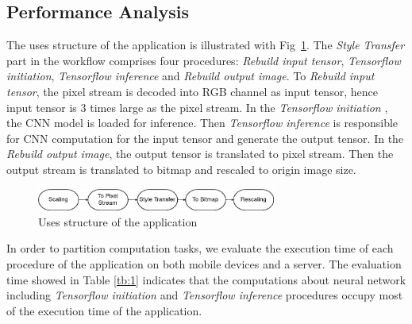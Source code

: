 \documentclass[a4paper,11pt,onecolumn,twoside]{article}
\begin{document}
\begin{CJK*}{GBK}{song}
\subsection{Performance Analysis}


The uses structure of the application is illustrated with Fig~\ref{fig:uses}.
The \emph{Style Transfer} part in the workflow comprises four procedures: 
\textit{Rebuild input tensor}, \textit{Tensorflow initiation}, 
\textit{Tensorflow inference} and \textit{Rebuild output image}.
To \textit{Rebuild input tensor}, the pixel stream is decoded
into RGB channel as input tensor, hence input tensor is 3 times
large as the pixel stream. In the \textit{Tensorflow initiation}
, the CNN model is loaded for inference. 
Then \textit{Tensorflow inference} is responsible for CNN 
computation for the input tensor and generate the output tensor.
In the \textit{Rebuild output image}, 
the output tensor is translated to pixel stream.
Then the output stream is translated to bitmap and rescaled to origin
image size.


\begin{figure}[!htb] %
  \centering %
  \includegraphics[width=0.7\textwidth]{uses} %
  \caption{Uses structure of the application} %
  \label{fig:uses} %
\end{figure}

In order to partition computation tasks,
we evaluate the execution time of each procedure of the application
on both mobile devices and a server. 
The evaluation time showed in Table \ref{tb:1} indicates that the 
computations about neural network including 
\textit{Tensorflow initiation}
and \textit{Tensorflow inference}\cite{tensorflow2015-whitepaper} 
procedures occupy most of the execution time of the application. 



\end{CJK*}
\end{document}
